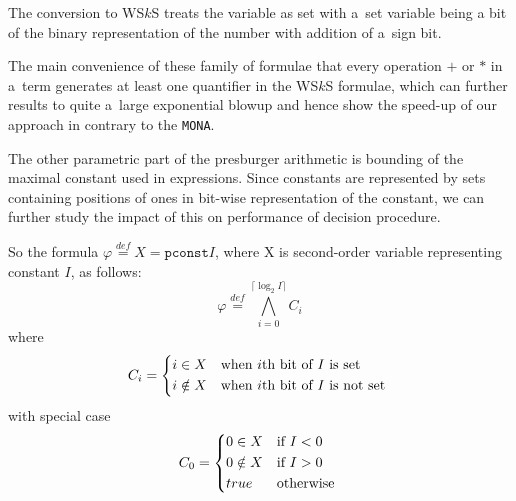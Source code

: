 The conversion to WS$k$S treats the variable as set with a~set variable being a
bit of the binary representation of the number with addition of a~sign bit.

The main convenience of these family of formulae that every operation $+$ or $*$
in a~term generates at least one quantifier in the WS$k$S formulae, which can
further results to quite a~large exponential blowup and hence show the speed-up
of our approach in contrary to the \texttt{MONA}.

The other parametric part of the presburger arithmetic is bounding of the
maximal constant used in expressions. Since constants are represented by sets
containing positions of ones in bit-wise representation of the constant, we can
further study the impact of this on performance of decision procedure.

So the formula $\varphi \overset{\mathit{def}}{=} X = \mathtt{pconst}{I}$, where
X is second-order variable representing constant $I$, as follows:
\begin{equation}
 \varphi \overset{\mathit{def}}{=} \bigwedge_{i = 0}^{\lceil \log_2 I\rceil} C_i
\end{equation}
where
\begin{equation}
  C_i = \begin{dcases*}
         i \in X  & when $i$th bit of $I$ is set\\
         i \notin X & when $i$th bit of $I$ is not set
         \end{dcases*}
\end{equation}
with special case
\begin{equation}
  C_0 = \begin{dcases*}
          0 \in X  & if $I < 0$\\
         0 \notin X & if $I > 0$\\
         true & otherwise
         \end{dcases*}
\end{equation}

